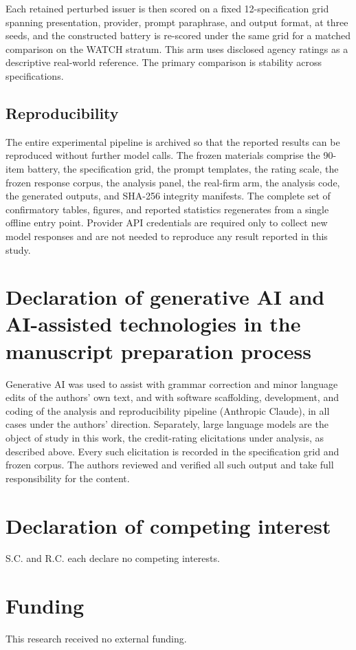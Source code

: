 \documentclass[a4paper,fleqn]{cas-sc}
\begin{document}
Each retained perturbed issuer is then scored on a fixed 12-specification grid spanning presentation,
provider, prompt paraphrase, and output format, at three seeds, and the constructed battery is re-scored
under the same grid for a matched comparison on the WATCH stratum. This arm uses disclosed agency ratings
as a descriptive real-world reference. The primary comparison is stability across specifications.

\subsection{Reproducibility}
The entire experimental pipeline is archived so that the reported results can be reproduced without
further model calls. The frozen materials comprise the 90-item battery, the specification grid, the
prompt templates, the rating scale, the frozen response corpus, the analysis panel, the real-firm arm,
the analysis code, the generated outputs, and SHA-256 integrity manifests. The complete set of
confirmatory tables, figures, and reported statistics regenerates from a single offline entry point.
Provider API credentials are required only to collect new model responses and are not needed to reproduce
any result reported in this study.

\section*{Declaration of generative AI and AI-assisted technologies in the manuscript preparation process}
Generative AI was used to assist with grammar correction and minor language edits of the authors' own
text, and with software scaffolding, development, and coding of the analysis and reproducibility pipeline
(Anthropic Claude), in all cases under the authors' direction. Separately, large language models are the
object of study in this work, the credit-rating elicitations under analysis, as described above. Every
such elicitation is recorded in the specification grid and frozen corpus. The authors reviewed and
verified all such output and take full responsibility for the content.

\printcredits

\section*{Declaration of competing interest}
S.C. and R.C. each declare no competing interests.

\section*{Funding}
This research received no external funding.
\end{document}
